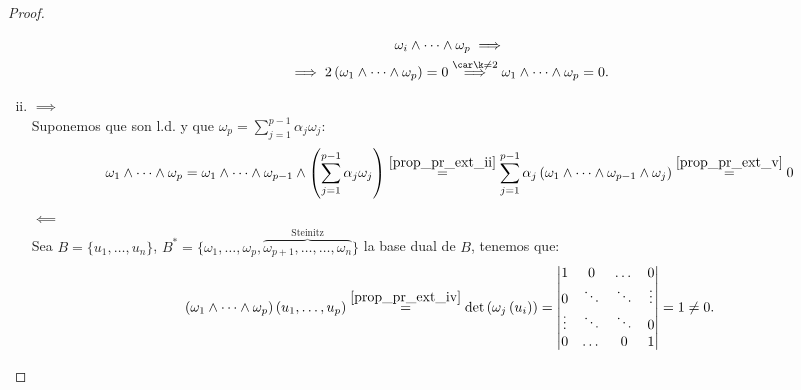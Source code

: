 \begin{proof}
\begin{enumerate}[i)]
\begin{gather*}
        \omega_i \wedge \dots \wedge \omega_p \implies \\
        \implies 2\left( \omega_1 \wedge \dots \wedge \omega_p \right) = 0
        \stackrel{\car \k \neq 2}{\implies} \omega_1 \wedge \dots \wedge \omega_p = 0.
        \end{gather*}
        \item $\implies$ \\
        Suponemos que son l.d. y que $\omega_p = \sum_{j=1}^{p-1} \alpha_j \omega_j$:
        \[
        \omega_1 \wedge \dots \wedge \omega_p = \omega_1 \wedge \dots \wedge \omega_{p-1} \wedge \left(
        \sum_{j=1}^{p-1} \alpha_j \omega_j \right) \stackrel{\ref{prop_pr_ext_ii}}{=} \sum_{j=1}^{p-1}
        \alpha_j \left( \omega_1 \wedge \dots \wedge \omega_{p-1} \wedge \omega_j \right)
        \stackrel{\ref{prop_pr_ext_v}}{=} 0
        \]
        $\impliedby$ \\
        Sea $B=\{u_1,\dots,u_n\}$, $B^*=\{\omega_1, \dots, \omega_p,\overbrace{\omega_{p+1},\dots, \dots,
            \omega_n}^{\text{Steinitz}} \}$ la base dual de $B$, tenemos que:
        \[
        \left( \omega_1 \wedge \dots \wedge \omega_p \right) \left( u_1,\dots,u_p \right) \stackrel{\ref{prop_pr_ext_iv}}{=}
        \det\left( \omega_j \left(u_i \right) \right) =
        \begin{vmatrix}
            1 & 0 & \dots & 0 \\
            0 & \ddots & \ddots & \vdots \\
            \vdots & \ddots & \ddots & 0 \\
            0 & \dots & 0 & 1
        \end{vmatrix}
        = 1 \neq 0.
        \]
    \end{enumerate}
\end{proof}


